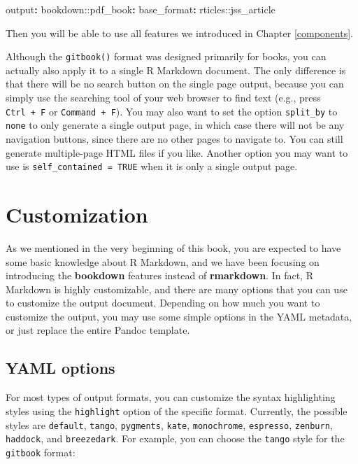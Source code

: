\documentclass[
  12pt,
]{krantz}
\newenvironment{Shaded}{\begin{snugshade}}{\end{snugshade}}
\newcommand{\AttributeTok}[1]{\textcolor[rgb]{0.77,0.63,0.00}{#1}}
\newcommand{\FunctionTok}[1]{\textcolor[rgb]{0.00,0.00,0.00}{#1}}
\newcommand{\KeywordTok}[1]{\textcolor[rgb]{0.13,0.29,0.53}{\textbf{#1}}}
\theoremstyle{definition}
\theoremstyle{definition}
\theoremstyle{definition}
\theoremstyle{definition}
\theoremstyle{remark}
\begin{document}
\begin{Shaded}
\begin{Highlighting}[]
\FunctionTok{output}\KeywordTok{:}
\AttributeTok{  bookdown:}\FunctionTok{:pdf\_book}\KeywordTok{:}
\AttributeTok{    }\FunctionTok{base\_format}\KeywordTok{:}\AttributeTok{ rticles::jss\_article}
\end{Highlighting}
\end{Shaded}

Then you will be able to use all features we introduced in Chapter \ref{components}.

Although the \texttt{gitbook()} format was designed primarily for books, you can actually also apply it to a single R Markdown document. The only difference is that there will be no search button on the single page output, because you can simply use the searching tool of your web browser to find text (e.g., press \texttt{Ctrl\ +\ F} or \texttt{Command\ +\ F}). You may also want to set the option \texttt{split\_by} to \texttt{none} to only generate a single output page, in which case there will not be any navigation buttons, since there are no other pages to navigate to. You can still generate multiple-page HTML files if you like. Another option you may want to use is \texttt{self\_contained\ =\ TRUE} when it is only a single output page.

\hypertarget{customization}{%
\chapter{Customization}\label{customization}}

As we mentioned in the very beginning of this book, you are expected to have some basic knowledge about R Markdown, and we have been focusing on introducing the \textbf{bookdown} features instead of \textbf{rmarkdown}. In fact, R Markdown is highly customizable, and there are many options that you can use to customize the output document. Depending on how much you want to customize the output, you may use some simple options in the YAML metadata, or just replace the entire Pandoc template.

\hypertarget{yaml-options}{%
\section{YAML options}\label{yaml-options}}

For most types of output formats, you can customize the syntax highlighting styles using the \texttt{highlight} option of the specific format. Currently, the possible styles are \texttt{default}, \texttt{tango}, \texttt{pygments}, \texttt{kate}, \texttt{monochrome}, \texttt{espresso}, \texttt{zenburn}, \texttt{haddock}, and \texttt{breezedark}. For example, you can choose the \texttt{tango} style for the \texttt{gitbook} format:
\end{document}
